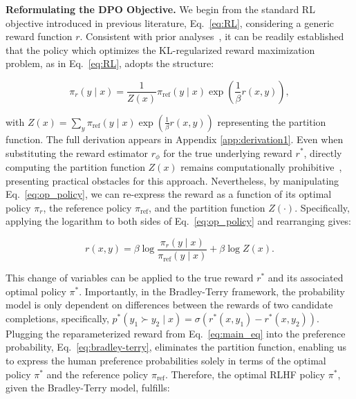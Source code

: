 \textbf{Reformulating the DPO Objective.} We begin from the standard RL objective introduced in previous literature, Eq.~\ref{eq:RL}, considering a generic reward function $r$. Consistent with prior analyses~\citep{peters2007reinforcement, peng2019advantage, korbak2022reinforcement, go2023aligning}, it can be readily established that the policy which optimizes the KL-regularized reward maximization problem, as in Eq.~\ref{eq:RL}, adopts the structure:

\begin{equation}\label{eq:op_policy}
    \pi_r(y\mid x) = \frac{1}{Z(x)}\pi_\text{ref}(y\mid x)\exp\left(\frac{1}{\beta}r(x, y)\right),
\end{equation}

with $Z(x) =\sum_{y}\pi_\text{ref}(y\mid x)\exp\left(\frac{1}{\beta}r(x, y)\right)$ representing the partition function. The full derivation appears in Appendix \ref{app:derivation1}. Even when substituting the reward estimator $r_{\phi}$ for the true underlying reward $r^*$, directly computing the partition function $Z(x)$ remains computationally prohibitive~\citep{korbak2022reinforcement, go2023aligning}, presenting practical obstacles for this approach. Nevertheless, by manipulating Eq.~\ref{eq:op_policy}, we can re-express the reward as a function of its optimal policy $\pi_r$, the reference policy $\pi_\text{ref}$, and the partition function $Z(\cdot)$. Specifically, applying the logarithm to both sides of Eq.~\ref{eq:op_policy} and rearranging gives:

\begin{equation}\label{eq:main_eq}
    r(x,y) =\beta \log \frac{\pi_r(y\mid x)}{\pi_\text{ref}(y\mid x)} + \beta \log Z(x).
\end{equation}

This change of variables can be applied to the true reward $r^*$ and its associated optimal policy $\pi^*$. Importantly, in the Bradley-Terry framework, the probability model is only dependent on differences between the rewards of two candidate completions, specifically, ${p^*(y_1 \succ y_2 \mid x) = \sigma(r^*(x, y_1) - r^*(x, y_2))}$. Plugging the reparameterized reward from Eq.~\ref{eq:main_eq} into the preference probability, Eq.~\ref{eq:bradley-terry}, eliminates the partition function, enabling us to express the human preference probabilities solely in terms of the optimal policy $\pi^*$ and the reference policy $\pi_\text{ref}$. Therefore, the optimal RLHF policy $\pi^*$, given the Bradley-Terry model, fulfills:

